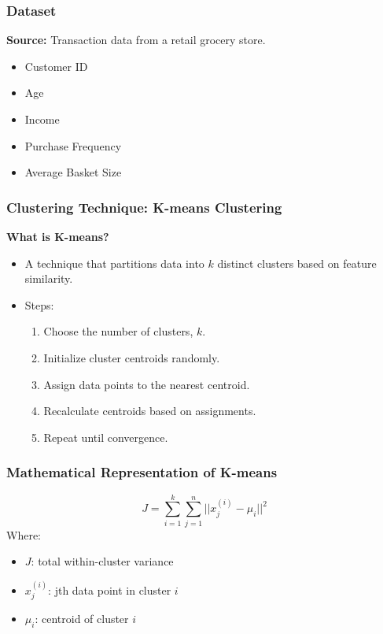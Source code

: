 \documentclass[aspectratio=169]{beamer}
\begin{document}
\begin{frame}[fragile]
    \frametitle{Dataset}
    \textbf{Source:} Transaction data from a retail grocery store.
    \begin{itemize}
        \item Customer ID
        \item Age
        \item Income
        \item Purchase Frequency
        \item Average Basket Size
    \end{itemize}
\end{frame}

\begin{frame}[fragile]
    \frametitle{Clustering Technique: K-means Clustering}
    \textbf{What is K-means?}
    \begin{itemize}
        \item A technique that partitions data into $k$ distinct clusters based on feature similarity.
        \item Steps:
        \begin{enumerate}
            \item Choose the number of clusters, $k$.
            \item Initialize cluster centroids randomly.
            \item Assign data points to the nearest centroid.
            \item Recalculate centroids based on assignments.
            \item Repeat until convergence.
        \end{enumerate}
    \end{itemize}
\end{frame}

\begin{frame}[fragile]
    \frametitle{Mathematical Representation of K-means}
    \begin{equation}
    J = \sum_{i=1}^{k} \sum_{j=1}^{n} ||x_j^{(i)} - \mu_i||^2
    \end{equation}
    Where:
    \begin{itemize}
        \item $J$: total within-cluster variance
        \item $x_j^{(i)}$: jth data point in cluster $i$
        \item $\mu_i$: centroid of cluster $i$
    \end{itemize}
\end{frame}
\end{document}
